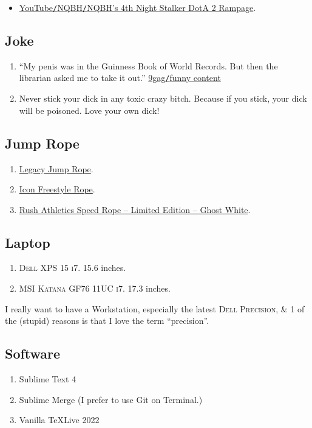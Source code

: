 \documentclass{article}
\begin{document}
\begin{itemize}
	\item \href{https://www.youtube.com/watch?v=d9vmHp-4f3k}{YouTube\texttt{/}NQBH\texttt{/}NQBH's 4th Night Stalker DotA 2 Rampage}.
\end{itemize}

\subsection{Joke}

\begin{enumerate}
	\item ``My penis was in the Guinness Book of World Records. But then the librarian asked me to take it out.'' \href{https://9gag.com/gag/aPZPm6q}{9gag\texttt{/}funny content}
	\item Never stick your dick in any toxic crazy bitch. Because if you stick, your dick will be poisoned. Love your own dick!
\end{enumerate}

\subsection{Jump Rope}

\begin{enumerate}
	\item \href{https://www.rushathletics.co.uk/collections/ropes/products/legacy-jump-rope}{Legacy Jump Rope}.
	\item \href{https://www.rushathletics.co.uk/collections/ropes/products/icon-freestyle-rope}{Icon Freestyle Rope}.
	\item \href{https://www.rushathletics.co.uk/collections/ropes/products/rush-athletics-speed-rope-ghost-white}{Rush Athletics Speed Rope -- Limited Edition -- Ghost White}.
\end{enumerate}

\subsection{Laptop}

\begin{enumerate}
	\item \textsc{Dell XPS 15 i7.} 15.6 inches.
	\item \textsc{MSI Katana GF76 11UC i7.} 17.3 inches.
\end{enumerate}
I really want to have a Workstation, especially the latest \textsc{Dell Precision}, \& 1 of the (stupid) reasons is that I love the term ``precision''.

\subsection{Software}

\begin{enumerate}
	\item Sublime Text 4
	\item Sublime Merge (I prefer to use Git on Terminal.)
	\item Vanilla \TeX Live 2022
\end{enumerate}


\printbibliography[heading=bibintoc]
\end{document}
